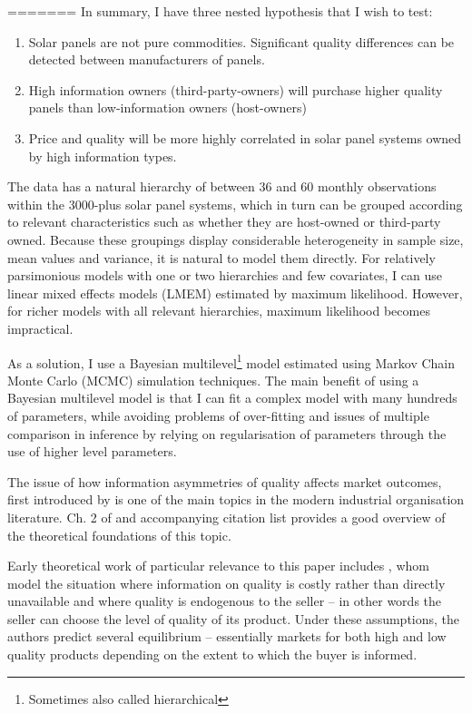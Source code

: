 \documentclass[12pt]{article}
\begin{document}
=======
In summary, I have three nested hypothesis that I wish to test:

\begin{enumerate}
  \item Solar panels are not pure commodities. Significant quality differences can be detected between manufacturers of panels.
  \item High information owners (third-party-owners) will purchase higher quality panels than low-information owners (host-owners)
  \item Price and quality will be more highly correlated in solar panel systems owned by high information types.
\end{enumerate}

The data has a natural hierarchy of between 36 and 60 monthly observations within the 3000-plus solar panel systems, which in turn can be grouped according to relevant characteristics such as whether they are host-owned or third-party owned. Because these groupings display considerable heterogeneity in sample size, mean values and variance, it is natural to model them directly. For relatively parsimonious models with one or two hierarchies and few covariates, I can use linear mixed effects models (LMEM) estimated by maximum likelihood. However, for richer models  with all relevant hierarchies, maximum likelihood becomes impractical.


As a solution, I use a Bayesian multilevel\footnote{Sometimes also called hierarchical} model estimated using Markov Chain Monte Carlo (MCMC) simulation techniques. The main benefit of using a Bayesian multilevel model is that I can fit a complex model with many hundreds of parameters, while avoiding problems of over-fitting and issues of multiple comparison in inference by relying on regularisation of parameters through the use of higher level parameters.

The issue of how information asymmetries of quality affects market outcomes, first introduced by \citet{akerlof_market_1970} is one of the main topics in the modern industrial organisation literature. Ch. 2 of \citet{tirole_theory_1988} and accompanying citation list provides a good overview of the theoretical foundations of this topic.

Early theoretical work of particular relevance to this paper includes \citet{chan_prices_1982}, whom model the situation where information on quality is costly rather than directly unavailable and where quality is endogenous to the seller -- in other words the seller can choose the level of quality of its product. Under these assumptions, the authors predict several equilibrium -- essentially markets for both high and low quality products depending on the extent to which the buyer is informed.
\end{document}
